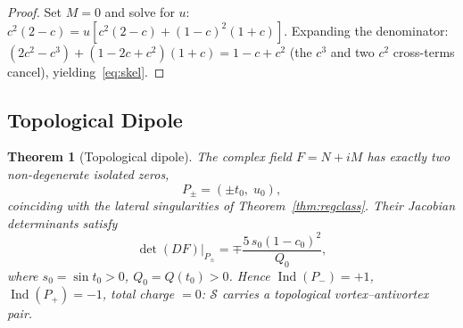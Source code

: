 \documentclass[12pt]{article}
\newtheorem{theorem}{Theorem}[section]
\DeclareMathOperator{\Ind}{Ind}
\begin{document}
\begin{proof}
Set $M=0$ and solve for $u$:
$c^2(2-c)=u[c^2(2-c)+(1-c)^2(1+c)]$.
Expanding the denominator:
$(2c^2-c^3)+(1-2c+c^2)(1+c) = 1-c+c^2$
(the $c^3$ and two $c^2$ cross-terms cancel), yielding~\eqref{eq:skel}.
\end{proof}

\subsection{Topological Dipole}
\label{ssec:dipole}

\begin{theorem}[Topological dipole]
\label{thm:dipole}
The complex field $F=N+iM$ has exactly two non-degenerate isolated zeros,
\begin{equation}
  P_\pm = (\pm t_0,\;u_0),
  \label{eq:zeros}
\end{equation}
coinciding with the lateral singularities of Theorem~\ref{thm:regclass}.
Their Jacobian determinants satisfy
\begin{equation}
  \det(DF)\big|_{P_\pm}
  = \mp\frac{5\,s_0(1-c_0)^2}{Q_0},
  \label{eq:detDF}
\end{equation}
where $s_0=\sin t_0>0$, $Q_0=Q(t_0)>0$.
Hence $\Ind(P_-)=+1$, $\Ind(P_+)=-1$,
total charge $= 0$:
$\mathcal{S}$ carries a topological \emph{vortex--antivortex pair}.
\end{theorem}
\end{document}
